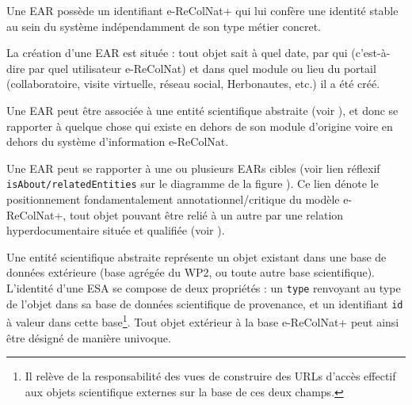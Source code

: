 \startitemize
\item Une EAR possède un identifiant e-ReColNat+ qui lui confère une identité stable au sein du système indépendamment de son type métier concret.
\item La création d'une EAR est située : tout objet sait à quel date, par qui (c'est-à-dire par quel utilisateur e-ReColNat) et dans quel module ou lieu du portail (collaboratoire, visite virtuelle, réseau social, Herbonautes, etc.) il a été créé.
\item Une EAR peut être associée à une entité scientifique abstraite (voir ), et donc se rapporter à quelque chose qui existe en dehors de son module d'origine voire en dehors du système d'information e-ReColNat.
\item Une EAR peut se rapporter à une ou plusieurs EARs cibles (voir lien réflexif {\tt isAbout/relatedEntities} sur le diagramme de la figure ).
Ce lien dénote le positionnement fondamentalement annotationnel/critique du modèle e-ReColNat+, tout objet pouvant être relié à un autre par une relation hyperdocumentaire située et qualifiée (voir ).
\stopitemize

\stopsection
\startsection[title={Entité scientifique abstraite (ESA)},reference=model:base:esa]

Une entité scientifique abstraite représente un objet existant dans une base de données extérieure (base agrégée du WP2, ou toute autre base scientifique).
L'identité d'une ESA se compose de deux propriétés : un {\tt type} renvoyant au type de l'objet dans sa base de données scientifique de provenance, et un identifiant {\tt id} à valeur dans cette base\footnote{Il relève de la responsabilité des vues de construire des URLs d'accès effectif aux objets scientifique externes sur la base de ces deux champs.}.
Tout objet extérieur à la base e-ReColNat+ peut ainsi être désigné de manière univoque.

\stopsection
\startsection[title={Situation},reference=model:base:situation]

